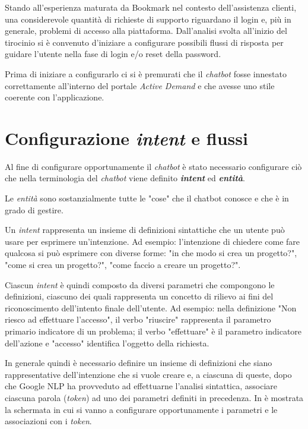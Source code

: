 Stando all'esperienza maturata da Bookmark nel contesto dell'assistenza clienti, una considerevole quantità di richieste di supporto riguardano il login e, più in generale, problemi di accesso alla piattaforma.
%
Dall'analisi svolta all'inizio del tirocinio si è convenuto d'iniziare a configurare possibili flussi di risposta per guidare l'utente nella fase di login e/o reset della password.

Prima di iniziare a configurarlo ci si è premurati che il \textit{chatbot} fosse innestato correttamente all'interno del portale \textit{Active Demand} e che avesse uno stile coerente con l'applicazione.

\section{Configurazione \textit{intent} e flussi}
Al fine di configurare opportunamente il \textit{chatbot} è stato necessario configurare ciò che nella terminologia del \textit{chatbot} viene definito \textbf{\textit{intent}} ed \textbf{\textit{entità}}.

Le \textit{entità} sono sostanzialmente tutte le "cose" che il chatbot conosce e che è in grado di gestire. 

Un \textit{intent} rappresenta un insieme di definizioni sintattiche che un utente può usare per esprimere un'intenzione.
%
Ad esempio: l'intenzione di chiedere come fare qualcosa si può esprimere con diverse forme: "in che modo si crea un progetto?", "come si crea un progetto?", "come faccio a creare un progetto?".

Ciascun \textit{intent} è quindi composto da diversi parametri che compongono le definizioni, ciascuno dei quali rappresenta un concetto di rilievo ai fini del riconoscimento dell'intento finale dell'utente. 
%
Ad esempio: nella definizione "Non riesco ad effettuare l'accesso", il verbo "riuscire" rappresenta il parametro primario indicatore di un problema; il verbo "effettuare" è il parametro indicatore dell'azione e "accesso" identifica l'oggetto della richiesta. 

In generale quindi è necessario definire un insieme di definizioni che siano rappresentative dell'intenzione che si vuole creare e, a ciascuna di queste, dopo che Google NLP ha provveduto ad effettuarne l'analisi sintattica, associare ciascuna parola (\textit{token}) ad uno dei parametri definiti in precedenza.
%
In  è mostrata la schermata in cui si vanno a configurare opportunamente i parametri e le associazioni con i \textit{token}.

